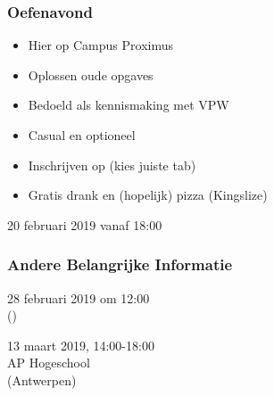 \documentclass{ucll-slides}
\begin{document}
\begin{frame}
  \frametitle{Oefenavond}
  \begin{itemize}
    \item Hier op Campus Proximus \\[2mm]
    \item Oplossen oude opgaves \\[2mm]
    \item Bedoeld als kennismaking met VPW \\[2mm]
    \item Casual en optioneel \\[2mm]
    \item Inschrijven op  (kies juiste tab)
    \item Gratis drank en (hopelijk) pizza (Kingslize)
  \end{itemize}
  \vskip5mm
  \begin{center} \Large
    20 februari 2019 vanaf 18:00 \\[2mm]
  \end{center}
\end{frame}

\begin{frame}
  \frametitle{Andere Belangrijke Informatie}
  \begin{center}
  \end{center}

  \begin{center} \Large
    28 februari 2019 om 12:00 \\ \small ()
  \end{center}

  \begin{center} \Large
    13 maart 2019, 14:00-18:00 \\[2mm]
    AP Hogeschool \\ \large (Antwerpen)
  \end{center}
\end{frame}
\end{document}

